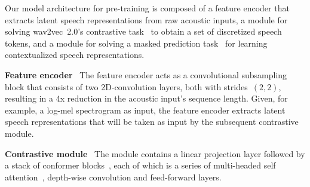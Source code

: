 \documentclass{article}
\begin{document}
\begin{table*}[htbp]
  \caption{Parameters for w2v-BERT models. Dim. stands for dimension.}
  \vskip 0.1in
  \label{tab:model_params}
  \centering
\end{table*}
Our model architecture for pre-training is composed of a feature encoder that extracts latent speech representations from raw acoustic inputs, a module for solving wav2vec~2.0's contrastive task~\cite{baevski2020wav2vec} to obtain a set of discretized speech tokens, and a module for solving a masked prediction task~\cite{devlin2019bert} for learning contextualized speech representations.

\newcommand{\myparagraph}[1]{\vspace{.4em} \noindent \textbf{#1}\ }
\myparagraph{Feature encoder}
The feature encoder acts as a convolutional subsampling block that consists of two 2D-convolution layers, both with strides~$(2, 2)$, resulting in a 4x reduction in the acoustic input's sequence length.
Given, for example, a log-mel spectrogram as input, the feature encoder extracts latent speech representations that will be taken as input by the subsequent contrastive module.

\myparagraph{Contrastive module}
The module contains a linear projection layer followed by a stack of conformer blocks~\cite{gulati2020conformer}, each of which is a series of multi-headed self attention~\cite{vaswani2017attention}, depth-wise convolution and feed-forward layers.
\end{document}
